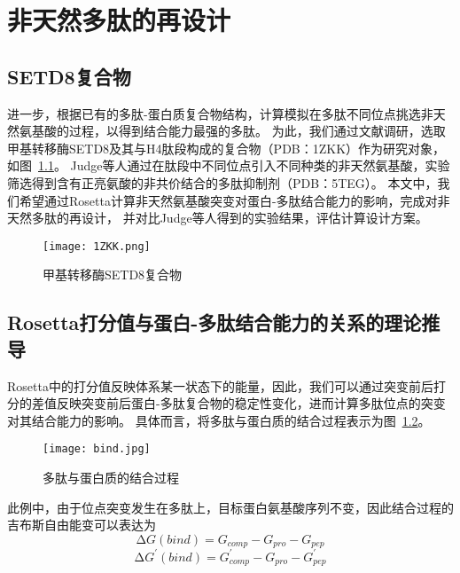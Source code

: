 
\chapter{非天然多肽的再设计}



\section{SETD8复合物}

进一步，根据已有的多肽-蛋白质复合物结构，计算模拟在多肽不同位点挑选非天然氨基酸的过程，以得到结合能力最强的多肽。
为此，我们通过文献调研，选取甲基转移酶SETD8及其与H4肽段构成的复合物（PDB：1ZKK）作为研究对象，如图~\ref{fig:complex}。
Judge等人通过在肽段中不同位点引入不同种类的非天然氨基酸，实验筛选得到含有正亮氨酸的非共价结合的多肽抑制剂（PDB：5TEG）。
本文中，我们希望通过Rosetta计算非天然氨基酸突变对蛋白-多肽结合能力的影响，完成对非天然多肽的再设计，
并对比Judge等人得到的实验结果，评估计算设计方案。
\begin{figure}
  \centering
  \texttt{[image: 1ZKK.png]}
  \caption{甲基转移酶SETD8复合物}
  \label{fig:complex}
\end{figure}


\section{Rosetta打分值与蛋白-多肽结合能力的关系的理论推导}

Rosetta中的打分值反映体系某一状态下的能量，因此，我们可以通过突变前后打分的差值反映突变前后蛋白-多肽复合物的稳定性变化，进而计算多肽位点的突变对其结合能力的影响。
具体而言，将多肽与蛋白质的结合过程表示为图~\ref{fig:bind}。
\begin{figure}
  \centering
  \texttt{[image: bind.jpg]}
  \caption{多肽与蛋白质的结合过程}
  \label{fig:bind}
\end{figure}

此例中，由于位点突变发生在多肽上，目标蛋白氨基酸序列不变，因此结合过程的吉布斯自由能变可以表达为
\begin{equation}
  \increment G(bind)=G_{comp}-G_{pro}-G_{pep}
  \label{eq:G_before_mutate}
\end{equation}
\begin{equation}
  \increment G^{'}(bind)=G_{comp}^{'}-G_{pro}-G_{pep}^{'}
  \label{eq:G_after_mutate}
\end{equation}

